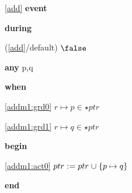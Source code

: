 \noindent \ref{add}  \textbf{event}
\begin{block}
  \item   \textbf{during}
  \begin{block}
  \item[ (\ref{add}/default) ]{$\false $} %
  \end{block}
  \item   \textbf{any} p,q
  \item   \textbf{when}
  \begin{block}
  \item[ \eqref{addm1:grd0} ]{$r \mapsto p \in \star ptr $} %
  \item[ \eqref{addm1:grd1} ]{$r \mapsto q \in \star ptr $} %
  \end{block}
  \item   \textbf{begin}
  \begin{block}
  \item[ \eqref{addm1:act0} ]{$ptr \mathrel{:\mkern1mu=} ptr \mathbin{\mkern1mu\cup\mkern1mu} \{ p \mapsto q \} $} %
  \end{block}
  \item   \textbf{end} \\
\end{block}
